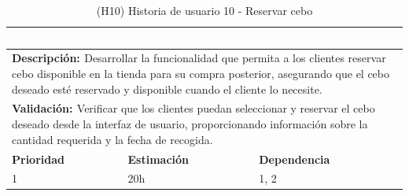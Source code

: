 \begin{table}[H]
  \centering
  \renewcommand{\arraystretch}{1.5}
  \begin{tabular}{|p{}|p{}|p{}|}
    \hline
    \multicolumn{3}{|l|}{\cellcolor{OrangeVIU}\textcolor{white}{\textbf{(H10) Historia de usuario 10: Reservar cebo}}} \\
    \hline
    \multicolumn{3}{|p{\dimexpr0.9\linewidth+2\tabcolsep+2\arrayrulewidth}|}{{\textbf{\textcolor{naranja}{Descripción: }}}Desarrollar la funcionalidad que permita a los clientes reservar cebo disponible en la tienda para su compra posterior, asegurando que el cebo deseado esté reservado y disponible cuando el cliente lo necesite.} \\
    \hline
    \multicolumn{3}{|p{\dimexpr0.9\linewidth+2\tabcolsep+2\arrayrulewidth}|}{{\textbf{\textcolor{naranja}{Validación: }} Verificar que los clientes puedan seleccionar y reservar el cebo deseado desde la interfaz de usuario, proporcionando información sobre la cantidad requerida y la fecha de recogida.}} \\
    \hline
    {\textbf{\textcolor{naranja}{Prioridad }}}  & {\textbf{\textcolor{naranja}{Estimación }}}  & {\textbf{\textcolor{naranja}{Dependencia }}}  \\
    \hline
    1 &  20h &  1, 2 \\
    \hline
  \end{tabular}
  \caption{(H10) Historia de usuario 10 - Reservar cebo}
  \label{table:H10}
\end{table}

